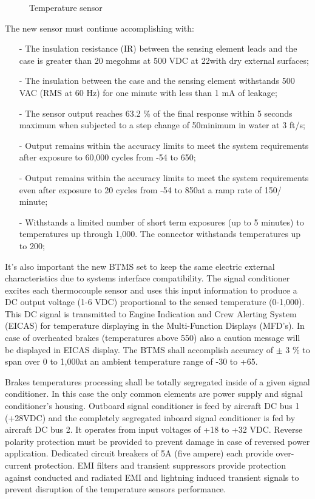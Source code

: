 \begin{figure}[H] %
\caption{Temperature sensor}
\label{fig:BTMSsensor}
\end{figure}


The new sensor must continue accomplishing with:

\begin{itemize}
\item[-]The insulation resistance (IR) between the sensing element leads and the case is greater than 20 megohms at 500 VDC at 22\celsius with dry external surfaces;
\item[-]The insulation between the case and the sensing element withstands 500 VAC (RMS at 60 Hz) for one minute with less than 1 mA of leakage;
\item[-]The sensor output reaches 63.2 \% of the final response within 5 seconds maximum when subjected to a step change of 50\celsius minimum in water at 3 ft/s;
\item[-]Output remains within the accuracy limits to meet the system requirements after exposure to 60,000 cycles from -54 to 650\celsius;
\item[-]Output remains within the accuracy limits to meet the system requirements even after exposure to 20 cycles from -54 to 850\celsius at a ramp rate of 150\celsius / minute;
\item[-]Withstands a limited number of short term exposures (up to 5 minutes) to temperatures up through 1,000\celsius. The connector withstands temperatures up to 200\celsius;
\end{itemize}

It's also important the new BTMS set to keep the same electric external characteristics due to systems interface compatibility. The signal conditioner excites each thermocouple sensor and uses this input information to produce a DC output voltage (1-6 VDC) proportional to the sensed temperature (0-1,000\celsius). This DC signal is transmitted to Engine Indication and Crew Alerting System (EICAS) for temperature displaying in the Multi-Function Displays (MFD's). In case of overheated brakes (temperatures above 550\celsius) also a caution message will be displayed in EICAS display. The BTMS shall accomplish accuracy of $\pm$ 3 \% to span over 0 to 1,000\celsius at an ambient temperature range of -30 to +65\celsius.

Brakes temperatures processing shall be totally segregated inside of a given signal conditioner. In this case the only common elements are power supply and signal conditioner's housing. Outboard signal conditioner is feed by aircraft DC bus 1 (+28VDC) and the completely segregated inboard signal conditioner is fed by aircraft DC bus 2. It operates from input voltages of +18 to +32 VDC. Reverse polarity protection must be provided to prevent damage in case of reversed power application. Dedicated circuit breakers of 5A (five ampere) each provide over-current protection. EMI filters and transient suppressors provide protection against conducted and radiated EMI and lightning induced transient signals to prevent disruption of the temperature sensors performance.

